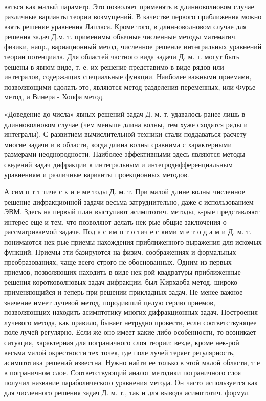 \documentclass[10pt]{article}
\begin{document}
ваться как малый параметр. Это позволяет применять в длинноволновом случае различные варианты теории возмущений. В качестве первого приближения можно взять решение уравнения Лапласа. Кроме того, в длинноволновом случае для решения задач Д.м. т. применимы обычные численные методы математич. физики, напр., вариационный метод, численное решение интөгральных уравнений теории потенциала. Для областей частного вида задачи Д. м. т. могут быть решены в явном виде, т. е. их решение представимо в виде рядов или интегралов, содержащих специальные функции. Наиболее важными приемами, позволяющими сдөлать это, являются метод разделения переменных, или Фурье метод, и Винера - Хопфа метод.



«Доведение до числа» явных решений задач Д. м. т. удавалось ранее лишь в длинноволновом случае (чем меньше длина волны, тем хуже сходятся ряды и интегралы). С развитием вычислительной техники стали поддаваться расчету многие задачи и в области, когда длина волны сравнима с характерными размерами неоднородности. Наиболее эффективными здесь являются методы сведений задач дифракции к интегральным и интегродифференциальным уравнениям и различные варианты проекционных методов.



А сим п т т тиче с к и е ме тоды Д. м. т. При малой длине волны численное решение дифракционной задачи весьма затруднительно, даже с использованием ЭВМ. Здесь на первый план выступают асимптотич. методы, к-рые представляют интерес еще и тем, что позволяют делать нек-рые общие заключения о рассматриваемой задаче. Под а с им п т о тич е с кими м е т о д а м и Д. м. т. понимаются нек-рые приемы нахождения приближенного выражения для искомых функций. Приемы эти базируются на физич. соображениях и формальных преобразованиях, чаще всего строго не обоснованных. Одним из первых приемов, позволяющих находить в виде нек-рой квадратуры приближенные решения коротковолновых задач дифракции, был Kирхаоба метод, широко применяющийся и теперь при решении прикладных задач. Не менее важное значение имеет лучевой метод, породивший целую серию приемов, позволяюшцих находить асимптотику многих дифракционных задач. Построения лучевого метода, как правило, бывает нетрудно провести, если соответствующее поле лучей регулярно. Если же оно имеет какие-либо особенности, то возникает ситуация, характерная для пограничного слоя теории: везде, кроме нек-рой весьма малой окрестности тех точек, где поле лучей теряет регулярность, асимптотика решений известна. Нужно найти ее только в этой малой области, т е в пограничном слое. Соответствующий аналог методики пограничного слоя получил название параболического уравнения метода. Он часто используется как для численного решения задач Д. м. т., так и для вывода асимптотич. формул.
\end{document}
